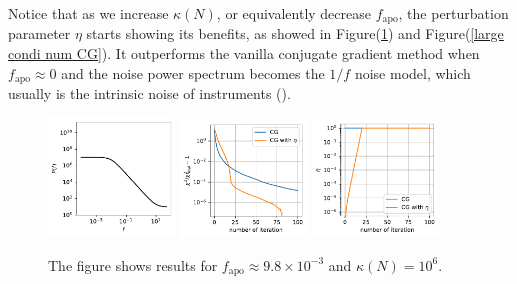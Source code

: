 \documentclass[twocolumn,linenumbers]{aastex631}
\begin{document}
Notice that as we increase $\kappa(N)$, or equivalently decrease
$f_{\text{apo}}$, the perturbation parameter $\eta$ starts showing its 
benefits, as showed in Figure(\ref{medium condi num CG}) and 
Figure(\ref{large condi num CG}).
It outperforms the vanilla conjugate gradient method when 
$f_{\text{apo}} \approx 0$ and the noise power spectrum becomes the $1/f$ noise model,
which usually is the intrinsic noise of instruments (\cite{1997PhRvD..56.4514T}).
\begin{figure}[htb!]
\centering
\includegraphics[width=0.3\textwidth]{0.1/medium_condition_num/P_f.pdf}
\includegraphics[width=0.3\textwidth]{0.1/medium_condition_num/chi2_CG.pdf}
\includegraphics[width=0.3\textwidth]{0.1/medium_condition_num/eta_CG.pdf}
\caption{The figure shows results for $f_{\text{apo}}\approx 9.8\times10^{-3}$ 
    and $\kappa(N) = 10^6$.
}
\label{medium condi num CG}
\end{figure}
\end{document}

